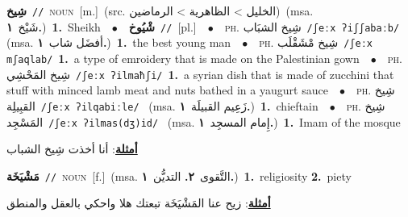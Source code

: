 \documentclass[10pt,a4paper,twoside]{article} %
\begin{document}
\begin{multicols}{2}
{\setlength\topsep{0pt}\textbf{\foreignlanguage{arabic}{شِيخ}}\ {\color{gray}\texttt{//}\color{black}}\ \textsc{noun}\ [m.]\ (src. \color{gray}\foreignlanguage{arabic}{الخليل > الظاهرية > الرماضين}\color{black})\ \color{gray}(msa. \foreignlanguage{arabic}{شَيْخ}~\foreignlanguage{arabic}{\textbf{١.}})\color{black}\ \textbf{1.}~Sheikh\ \ $\bullet$\ \ \setlength\topsep{0pt}\textbf{\foreignlanguage{arabic}{شْيُوخ}}\ {\color{gray}\texttt{//}\color{black}}\ [pl.]\ \ $\bullet$\ \ \textsc{ph.} \color{gray} \foreignlanguage{arabic}{شِيخ الشبَاب}\color{black}\ {\color{gray}\texttt{/{\sffamily ʃeːx ʔiʃʃabaːb}/}\color{black}}\ \color{gray} (msa. \foreignlanguage{arabic}{أفضَل شاب}~\foreignlanguage{arabic}{\textbf{١.}})\color{black}\ \textbf{1.}~the best young man\ \ $\bullet$\ \ \textsc{ph.} \color{gray} \foreignlanguage{arabic}{شِيخ مْشَقْلَب}\color{black}\ {\color{gray}\texttt{/{\sffamily ʃeːx mʃaqlab}/}\color{black}}\ \textbf{1.}~a type of emroidery that is made on the Palestinian gown\ \ $\bullet$\ \ \textsc{ph.} \color{gray} \foreignlanguage{arabic}{شِيخ المَحْشِي}\color{black}\ {\color{gray}\texttt{/{\sffamily ʃeːx ʔilmaħʃi}/}\color{black}}\ \textbf{1.}~a syrian dish that is made of zucchini that stuff with minced lamb meat and nuts bathed in a yaugurt sauce\ \ $\bullet$\ \ \textsc{ph.} \color{gray} \foreignlanguage{arabic}{شِيخ القبِيلِة}\color{black}\ {\color{gray}\texttt{/{\sffamily ʃeːx ʔilqabiːle}/}\color{black}}\ \color{gray} (msa. \foreignlanguage{arabic}{زَعِيم القبيلَة}~\foreignlanguage{arabic}{\textbf{١.}})\color{black}\ \textbf{1.}~chieftain\ \ $\bullet$\ \ \textsc{ph.} \color{gray} \foreignlanguage{arabic}{شِيخ المَسْجِد}\color{black}\ {\color{gray}\texttt{/{\sffamily ʃeːx ʔilmas(dʒ)id}/}\color{black}}\ \color{gray} (msa. \foreignlanguage{arabic}{إِمام المسجِد}~\foreignlanguage{arabic}{\textbf{١.}})\color{black}\ \textbf{1.}~Imam of the mosque\  \begin{flushright}\color{gray}\foreignlanguage{arabic}{\textbf{\underline{\foreignlanguage{arabic}{أمثلة}}}: أنا أخذت شِيخ الشباب}\end{flushright}\color{black}} \vspace{2mm}

{\setlength\topsep{0pt}\textbf{\foreignlanguage{arabic}{مَشْيَخَة}}\ {\color{gray}\texttt{//}\color{black}}\ \textsc{noun}\ [f.]\ \color{gray}(msa. \foreignlanguage{arabic}{التَّقوى}~\foreignlanguage{arabic}{\textbf{٢.}}  \foreignlanguage{arabic}{التديُّن}~\foreignlanguage{arabic}{\textbf{١.}})\color{black}\ \textbf{1.}~religiosity  \textbf{2.}~piety\  \begin{flushright}\color{gray}\foreignlanguage{arabic}{\textbf{\underline{\foreignlanguage{arabic}{أمثلة}}}: زيح عنا المَشْيَخَة تبعتك هلا واحكي بالعقل والمنطق}\end{flushright}\color{black}} \vspace{2mm}


\end{multicols}
\end{document}
